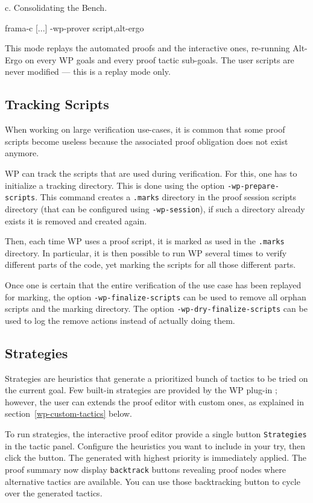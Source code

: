 c. Consolidating the Bench.
\begin{logs}
  frama-c [...] -wp-prover script,alt-ergo
\end{logs}

This mode replays the automated proofs and the interactive ones, re-running Alt-Ergo on every \textsf{WP} goals and every proof tactic sub-goals. The user scripts are never modified — this is a replay mode only.

\subsection{Tracking Scripts}

When working on large verification use-cases, it is common that some proof scripts
become useless because the associated proof obligation does not exist anymore.

WP can track the scripts that are used during verification. For this, one has to
initialize a tracking directory. This is done using the option
\verb+-wp-prepare-scripts+. This command creates a \verb+.marks+ directory in the
proof session scripts directory (that can be configured using \verb+-wp-session+),
if such a directory already exists it is removed and created again.

Then, each time WP uses a proof script, it is marked as used in the \verb+.marks+
directory. In particular, it is then possible to run WP
several times to verify different parts of the code, yet marking the scripts for
all those different parts.

Once one is certain that the entire verification of the use case has been replayed
for marking, the option \verb+-wp-finalize-scripts+ can be used to remove all
orphan scripts and the marking directory. The option \verb+-wp-dry-finalize-scripts+
can be used to log the remove actions instead of actually doing them.

\subsection{Strategies}

Strategies are heuristics that generate a prioritized bunch of tactics to be tried on the current goal.
Few built-in strategies are provided by the \textsf{WP} plug-in ; however, the user can extends the proof editor with
custom ones, as explained in section~\ref{wp-custom-tactics} below.

To run strategies, the interactive proof editor provide a single button \texttt{Strategies} in the tactic panel.
Configure the heuristics you want to include in your try, then click the button. The generated with highest priority is immediately applied. The proof summary now display \texttt{backtrack} buttons revealing proof nodes where alternative tactics are available. You can use those backtracking button to cycle over the generated tactics.

